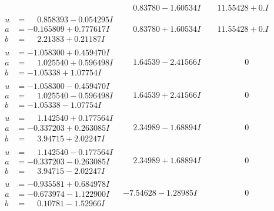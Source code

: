 \documentclass[1p]{elsarticle_modified}
\theoremstyle{definition}
\begin{document}
$$\begin{array}{c|c|c}
 & \phantom{-}0.83780 - 1.60534 I & \phantom{-}11.55428 + 0. I\phantom{ +0.000000I} \\ \hline\begin{aligned}
u &= \phantom{-}0.858393 - 0.054295 I \\
a &= -0.165809 + 0.777617 I \\
b &= \phantom{-}2.21383 + 0.21187 I\end{aligned}
 & \phantom{-}0.83780 + 1.60534 I & \phantom{-}11.55428 + 0. I\phantom{ +0.000000I} \\ \hline\begin{aligned}
u &= -1.058300 + 0.459470 I \\
a &= \phantom{-}1.025540 + 0.596498 I \\
b &= -1.05338 + 1.07754 I\end{aligned}
 & \phantom{-}1.64539 - 2.41566 I & \phantom{-0.000000 } 0 \\ \hline\begin{aligned}
u &= -1.058300 - 0.459470 I \\
a &= \phantom{-}1.025540 - 0.596498 I \\
b &= -1.05338 - 1.07754 I\end{aligned}
 & \phantom{-}1.64539 + 2.41566 I & \phantom{-0.000000 } 0 \\ \hline\begin{aligned}
u &= \phantom{-}1.142540 + 0.177564 I \\
a &= -0.337203 + 0.263085 I \\
b &= \phantom{-}3.94715 + 2.02247 I\end{aligned}
 & \phantom{-}2.34989 - 1.68894 I & \phantom{-0.000000 } 0 \\ \hline\begin{aligned}
u &= \phantom{-}1.142540 - 0.177564 I \\
a &= -0.337203 - 0.263085 I \\
b &= \phantom{-}3.94715 - 2.02247 I\end{aligned}
 & \phantom{-}2.34989 + 1.68894 I & \phantom{-0.000000 } 0 \\ \hline\begin{aligned}
u &= -0.935581 + 0.684978 I \\
a &= -0.673974 - 1.122900 I \\
b &= \phantom{-}0.10781 - 1.52966 I\end{aligned}
 & -7.54628 - 1.28985 I & \phantom{-0.000000 } 0 \\ \hline\begin{aligned}

\end{aligned}
\end{array}$$
\end{document}
